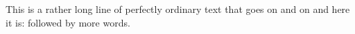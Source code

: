 \documentclass{article}
\begin{document}
This is a rather long line of perfectly ordinary text that goes on and on and here it is: \foo followed by more words.
\end{document}
